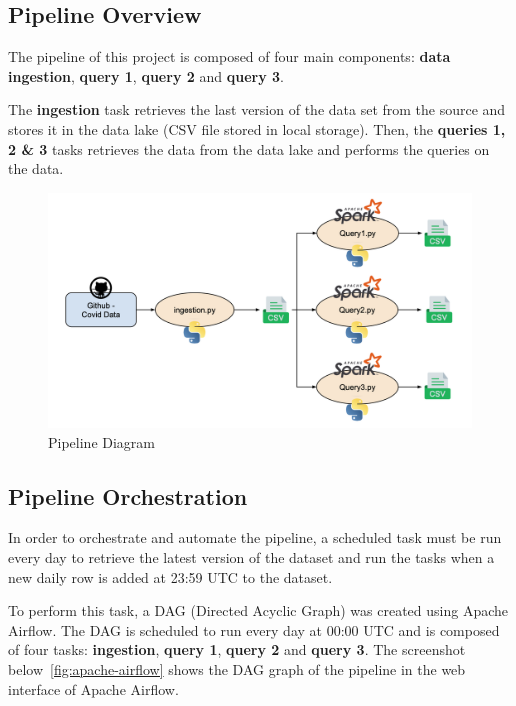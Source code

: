 \documentclass[12pt,oneside]{book} %
\begin{document}
\subsection{Pipeline Overview}

The pipeline of this project is composed of four main components: \textbf{data
    ingestion}, \textbf{query 1}, \textbf{query 2} and \textbf{query 3}.\newline

The \textbf{ingestion} task retrieves the last version of the data set from the
source and stores it in the data lake (CSV file stored in local storage). Then,
the \textbf{queries 1, 2 \& 3} tasks retrieves the data from the data lake and
performs the queries on the data.

\begin{figure}[h]
    \centering
    \includegraphics[width=1\linewidth]{images/pipeline.png}
    \caption{Pipeline Diagram}
\end{figure}

\newpage
\subsection{Pipeline Orchestration}

In order to orchestrate and automate the pipeline, a scheduled task must be run
every day to retrieve the latest version of the dataset and run the tasks when
a new daily row is added at 23:59 UTC to the dataset.\newline

To perform this task, a DAG (Directed Acyclic Graph) was created using Apache
Airflow. The DAG is scheduled to run every day at 00:00 UTC and is composed of
four tasks: \textbf{ingestion}, \textbf{query 1}, \textbf{query 2} and
\textbf{query 3}. The screenshot below~\ref{fig:apache-airflow} shows the DAG
graph of the pipeline in the web interface of Apache Airflow.\newline
\end{document}
